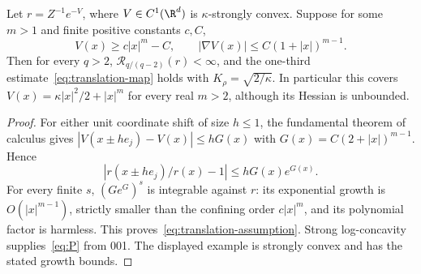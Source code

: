 \begin{corollary}\label{cor:polynomial}
Let $r=Z^{-1}e^{-V}$, where $V\in C^1(\R^d)$ is $\kappa$-strongly convex. Suppose for some $m>1$ and finite positive constants $c,C$,
\[
 V(x)\ge c|x|^m-C,\qquad
 |\nabla V(x)|\le C(1+|x|)^{m-1}.
\]
Then for every $q>2$, $\mathcal R_{q/(q-2)}(r)<\infty$, and the one-third estimate~\eqref{eq:translation-map} holds with $K_\rho=\sqrt{2/\kappa}$.
In particular this covers $V(x)=\kappa|x|^2/2+|x|^m$ for every real $m>2$, although its Hessian is unbounded.
\end{corollary}
\begin{proof}
For either unit coordinate shift of size $h\le1$, the fundamental theorem of calculus gives
$|V(x\pm he_j)-V(x)|\le hG(x)$ with
$G(x)=C(2+|x|)^{m-1}$. Hence
\[
 \left|r(x\pm he_j)/r(x)-1\right|
 \le hG(x)e^{G(x)}.
\]
For every finite $s$, $(G e^G)^s$ is integrable against $r$: its exponential growth is $O(|x|^{m-1})$, strictly smaller than the confining order $c|x|^m$, and its polynomial factor is harmless. This proves~\eqref{eq:translation-assumption}. Strong log-concavity supplies~\eqref{eq:P} from 001. The displayed example is strongly convex and has the stated growth bounds.
\end{proof}

